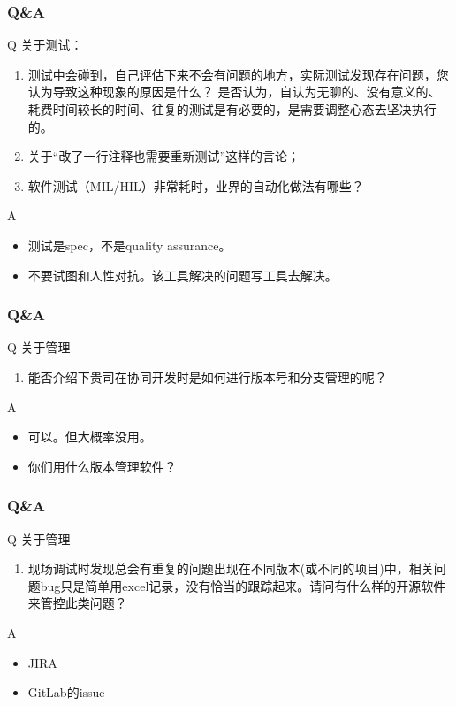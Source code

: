 \documentclass[UTF8,lualatex]{ctexbeamer}
\begin{document}
\begin{frame}
    \frametitle{Q\&A}
    \begin{alertblock}{Q}
        关于测试：
        \begin{enumerate}
            \item 测试中会碰到，自己评估下来不会有问题的地方，实际测试发现存在问题，您认为导致这种现象的原因是什么？ 是否认为，自认为无聊的、没有意义的、耗费时间较长的时间、往复的测试是有必要的，是需要调整心态去坚决执行的。
            \item 关于“改了一行注释也需要重新测试”这样的言论；
            \item 软件测试（MIL/HIL）非常耗时，业界的自动化做法有哪些？
        \end{enumerate}
    \end{alertblock}
    \begin{block}{A}
        \begin{itemize}
            \item 测试是spec，不是quality assurance。
            \item 不要试图和人性对抗。该工具解决的问题写工具去解决。
        \end{itemize}
    \end{block}
\end{frame}

\begin{frame}
    \frametitle{Q\&A}
    \begin{alertblock}{Q}
        关于管理
        \begin{enumerate}
            \item 能否介绍下贵司在协同开发时是如何进行版本号和分支管理的呢？
        \end{enumerate}
    \end{alertblock}
    \begin{block}{A}
        \begin{itemize}
            \item 可以。但大概率没用。
            \item 你们用什么版本管理软件？
        \end{itemize}
    \end{block}
\end{frame}

\begin{frame}
    \frametitle{Q\&A}
    \begin{alertblock}{Q}
        关于管理
        \begin{enumerate}
            \item 现场调试时发现总会有重复的问题出现在不同版本(或不同的项目)中，相关问题bug只是简单用excel记录，没有恰当的跟踪起来。请问有什么样的开源软件来管控此类问题？
        \end{enumerate}
    \end{alertblock}
    \begin{block}{A}
        \begin{itemize}
            \item JIRA
            \item GitLab的issue
        \end{itemize}
    \end{block}
\end{frame}
\end{document}
